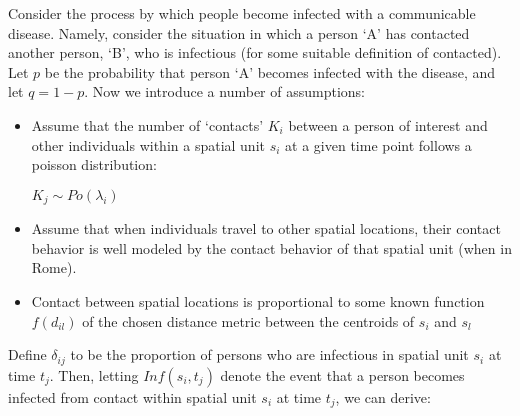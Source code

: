 \documentclass[12pt]{article}
\begin{document}
Consider the process by which people become infected with a communicable disease. 
Namely, consider the situation in which a person `A' has contacted another person, `B', 
who is infectious (for some suitable definition of contacted). 
Let $p$ be the probability that person `A' becomes infected with the disease, and
let $q=1-p$. Now we introduce a number of assumptions:

\begin{itemize}

    \item Assume that the number of `contacts' $K_i$ between a person of interest 
    and other individuals within a spatial unit $s_i$ at a given time point follows a poisson 
    distribution:\\
    \begin{center}
        $K_j \sim Po(\lambda_i)$
    \end{center}
    \item Assume that when individuals travel to other spatial locations, their 
        contact behavior is well modeled by the contact behavior of that spatial unit (when in Rome).  
    \item Contact between spatial locations is proportional to some known function $f(d_{il})$
        of the chosen distance metric between the centroids of $s_i$ and $s_l$
\end{itemize}

Define $\delta_{ij}$ to be the proportion of persons who are infectious in spatial unit $s_i$ 
at time $t_j$. Then, letting $Inf(s_i, t_j)$ denote the event that a person becomes 
infected from contact within spatial unit $s_i$ at time $t_j$, we can derive:
\end{document}
